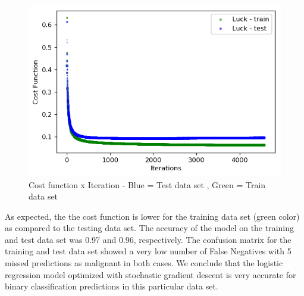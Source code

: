 \documentclass{article}
\begin{document}
\begin{figure}[H]
    \centering
    \includegraphics[width=1\linewidth]{cost_function}
    \caption{Cost function x Iteration - Blue = Test data set , Green = Train data set}
    \label{fig:cancer}
\end{figure}

As expected, the the cost function is lower for the training data set (green color) as compared to the testing data set. The accuracy of the model on the training and test data set was 0.97 and 0.96, respectively. The confusion matrix for the training and test data set showed a very low number of False Negatives with 5 missed predictions as malignant in both cases.  We conclude that the logistic regression model optimized with stochastic gradient descent is very accurate for binary classification predictions in this particular data set.

\newpage
\end{document}
